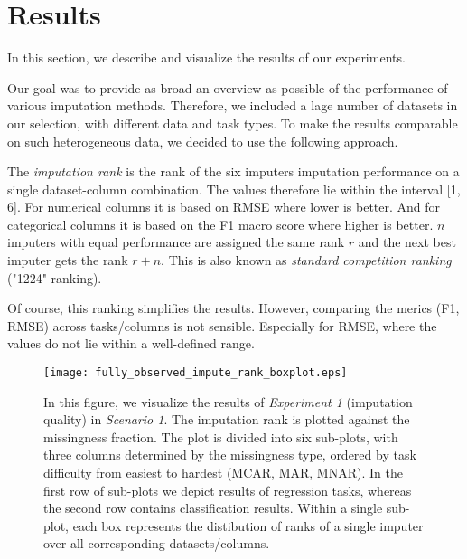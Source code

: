 \section{Results}
\label{sec:results}

In this section, we describe and visualize the results of our experiments.

Our goal was to provide as broad an overview as possible of the performance of various imputation methods. Therefore, we included a lage number of datasets in our selection, with different data and task types. To make the results comparable on such heterogeneous data, we decided to use the following approach.

The \textit{imputation rank} is the rank of the six imputers imputation performance on a single dataset-column combination. The values therefore lie within the interval [1, 6]. For numerical columns it is based on RMSE where lower is better. And for categorical columns it is based on the F1 macro score where higher is better. $n$ imputers with equal performance are assigned the same rank $r$ and the next best imputer gets the rank $r+n$. This is also known as \textit{standard competition ranking} ("1224" ranking).

Of course, this ranking simplifies the results. However, comparing the merics (F1, RMSE) across tasks/columns is not sensible. Especially for RMSE, where the values do not lie within a well-defined range.

\begin{figure}\centering
    \texttt{[image: fully\_observed\_impute\_rank\_boxplot.eps]}
    \caption[Scenario 1 Imputation Ranks]{In this figure, we visualize the results of \textit{Experiment 1} (imputation quality) in \textit{Scenario 1}. The imputation rank is plotted against the missingness fraction. The plot is divided into six sub-plots, with three columns determined by the missingness type, ordered by task difficulty from easiest to hardest (MCAR, MAR, MNAR). In the first row of sub-plots we depict results of regression tasks, whereas the second row contains classification results. Within a single sub-plot, each box represents the distibution of ranks of a single imputer over all corresponding datasets/columns.}\label{fig:fully_observed_impute_rank_boxplot}
\end{figure}


